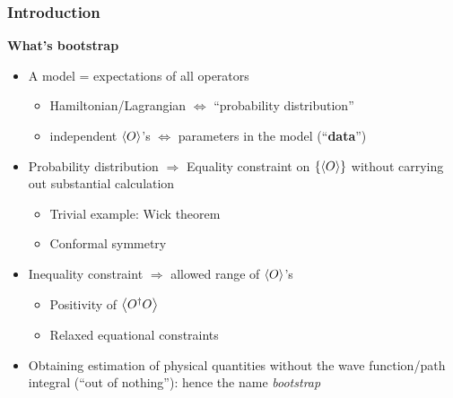 \documentclass{beamer}
\newcommand{\concept}[1]{\textbf{#1}}
\begin{document}
\begin{frame}
\frametitle{Introduction}

\textbf{What's bootstrap}

\begin{itemize}
    \item A model = expectations of all operators
    \begin{itemize}
        \item Hamiltonian/Lagrangian $\Leftrightarrow$ ``probability distribution''
        \item independent $\expval{O}$'s $\Leftrightarrow$ parameters in the model (``\concept{data}'')
    \end{itemize}
    
    \item Probability distribution $\Rightarrow$ Equality constraint on $\{\expval{O}\}$ without carrying out substantial calculation
    \begin{itemize}
        \item Trivial example: Wick theorem
        \item Conformal symmetry 
    \end{itemize}
    \item Inequality constraint $\Rightarrow$ allowed range of $\expval{O}$'s
    \begin{itemize}
        \item Positivity of $\expval{O^\dagger O}$
        \item Relaxed equational constraints
    \end{itemize}
    \item Obtaining estimation of physical quantities without the wave function/path integral (``out of nothing''): 
    hence the name \emph{bootstrap}
\end{itemize}

\vspace{1em}

\end{frame}
\end{document}
